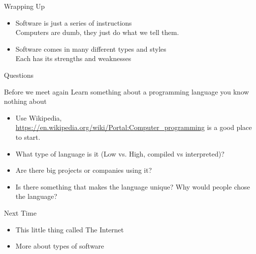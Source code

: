 \documentclass[serif,mathserif,compress]{beamer}
\begin{document}
\begin{frame}{Wrapping Up}
  \begin{itemize}
    \item Software is just a series of instructions\\Computers are dumb, they just do what we tell them.
    \item Software comes in many different types and styles\\Each has its strengths and weaknesses
  \end{itemize}
\end{frame}

\begin{frame}{Questions}
\end{frame}

\begin{frame}{Before we meet again}
  Learn something about a programming language you know nothing about
  \begin{itemize}
    \item Use Wikipedia, \url{https://en.wikipedia.org/wiki/Portal:Computer_programming} is a good place to start.
    \item What type of language is it (Low vs. High, compiled vs interpreted)?
    \item Are there big projects or companies using it?
    \item Is there something that makes the language unique? Why would people chose the language?
  \end{itemize}
\end{frame}

\begin{frame}{Next Time}
  \begin{itemize}
    \item This little thing called The Internet
    \item More about types of software
  \end{itemize}
\end{frame}
\end{document}
